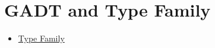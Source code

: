 \chapter{GADT and Type Family}

\begin{itemize}
    \item \href{https://wiki.haskell.org/GHC/Type_familiesl}{Type Family}
\end{itemize}
